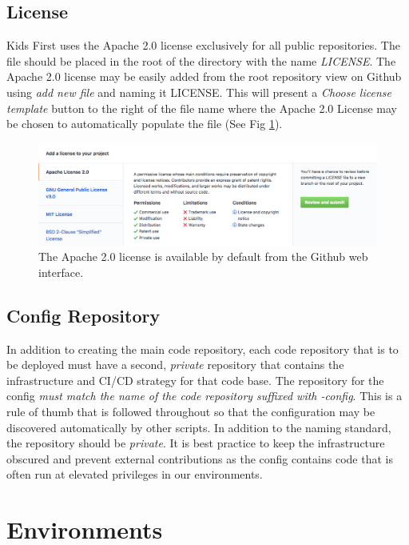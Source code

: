 \documentclass[a4paper,12pt,titlepage]{scrartcl}
\begin{document}
	\subsection{License}
	
	Kids First uses the Apache 2.0 \cite{apache2} license exclusively for all public repositories.
	The file should be placed in the root of the directory with the name {\em LICENSE}.
	The Apache 2.0 license may be easily added from the root repository view on Github using {\em add new file} and naming it LICENSE.
	This will present a {\em Choose license template} button to the right of the file name where the Apache 2.0 License may be chosen to automatically populate the file (See Fig \ref{fig:addlicense}).
	
	\begin{figure}[t]
    		\centering
    		\includegraphics[width=0.8\linewidth]{images/license.png}
    		\caption{The Apache 2.0 license is available by default from the Github web interface.}
    		\label{fig:addlicense}
    \end{figure}
	
	\subsection{Config Repository}
	
	In addition to creating the main code repository, each code repository that is to be deployed must have a second, {\em private} repository that contains the infrastructure and CI/CD strategy for that code base.
	The repository for the config {\em must match the name of the code repository suffixed with -config}.
	This is a rule of thumb that is followed throughout so that the configuration may be discovered automatically by other scripts.
	In addition to the naming standard, the repository should be {\em private}.
	It is best practice to keep the infrastructure obscured and prevent external contributions as the config contains code that is often run at elevated privileges in our environments.
	
	\section{Environments}
	
\end{document}

